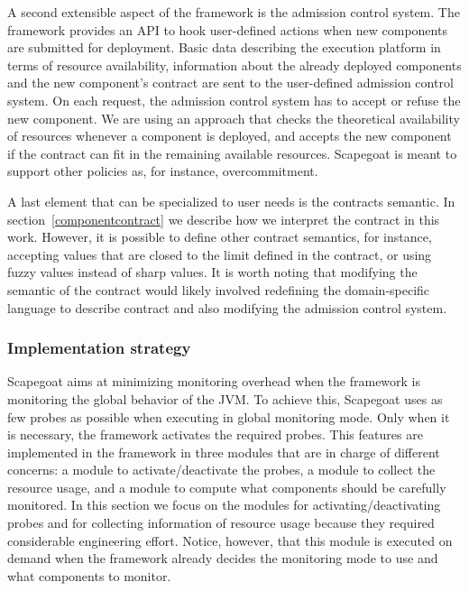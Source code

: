 A second extensible aspect of the framework is the admission control system.
The framework provides an API to hook user-defined actions when new components are submitted for deployment.
Basic data describing the execution platform in terms of resource availability, information about the already deployed components and the new component's contract are sent to the user-defined admission control system.
On each request, the admission control system has to accept or refuse the new component.
We are using an approach that checks the theoretical availability of resources whenever a component is deployed, and accepts the new component if the contract can fit in the remaining available resources.
Scapegoat is meant to support other policies as, for instance, overcommitment.
 
A last element that can be specialized to user needs is the contracts semantic.
In section~\ref{componentcontract} we describe how we interpret the contract in this work.
However, it is possible to define other contract semantics, for instance, accepting values that are closed to the limit defined in the contract, or using fuzzy values instead of sharp values.
It is worth noting that modifying the semantic of the contract would likely involved redefining the domain-specific language to describe contract and also modifying the admission control system.
 


\subsubsection{Implementation strategy}
Scapegoat aims at minimizing monitoring overhead when the framework is monitoring the global behavior of the JVM. 
To achieve this, Scapegoat uses as few probes as possible when executing in global monitoring mode.
Only when it is necessary, the framework activates the required probes.
This features are implemented in the framework in three modules that are in charge of different concerns: a module to activate/deactivate the probes, a module to collect the resource usage, and a module to compute what components should be carefully monitored.
In this section we focus on the modules for activating/deactivating probes and for collecting information of resource usage because they required considerable engineering effort.
Notice, however, that this module is executed on demand when the framework already decides the monitoring mode to use and what components to monitor.

